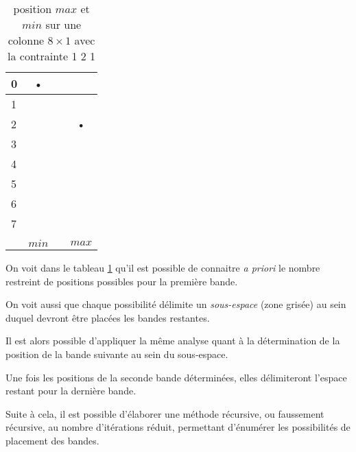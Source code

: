 \documentclass[a4paper,12pt]{report}
\newcommand\black{\cellcolor{black}}
\newcommand\grey{\cellcolor{black!50}}
\begin{document}
\begin{table}[H]
\centering
\begin{tabular}{|l||c|c|c|}
\hline 
0&\black• &  &  \\ 
\hline 
1 & &  &  \\ 
\hline 
2 & \grey &  & \black• \\ 
\hline 
3&\grey &  & \\ 
\hline 
4&\grey &  & \grey \\ 
\hline 
5&\grey &  & \grey \\ 
\hline 
6&\grey &  & \grey \\ 
\hline 
7&\grey &  & \grey \\ 
\hline &&\\
[-1.3em]\hline
&$min$ &  & $max$ \\ 
\hline 
\end{tabular} 
\caption{\label{bande8X1} position $max$ et $min$ sur une colonne $8\times1$ avec la contrainte 1 2 1}
\end{table}


On voit dans le tableau \ref{bande8X1} qu'il est possible de connaitre \textit{a priori} le nombre restreint de positions possibles pour la première bande. 

On voit aussi que chaque possibilité délimite un \textit{sous-espace} (zone grisée) au sein duquel devront être placées les bandes restantes.

Il est alors possible d'appliquer la même analyse quant à la détermination de la position de la bande suivante au sein du sous-espace.

Une fois les positions de la seconde bande déterminées, elles délimiteront l'espace restant pour la dernière bande. 

Suite à cela, il est possible d'élaborer une méthode récursive, ou faussement récursive, au nombre d'itérations réduit, permettant d'énumérer les possibilités de placement des bandes.
\end{document}
